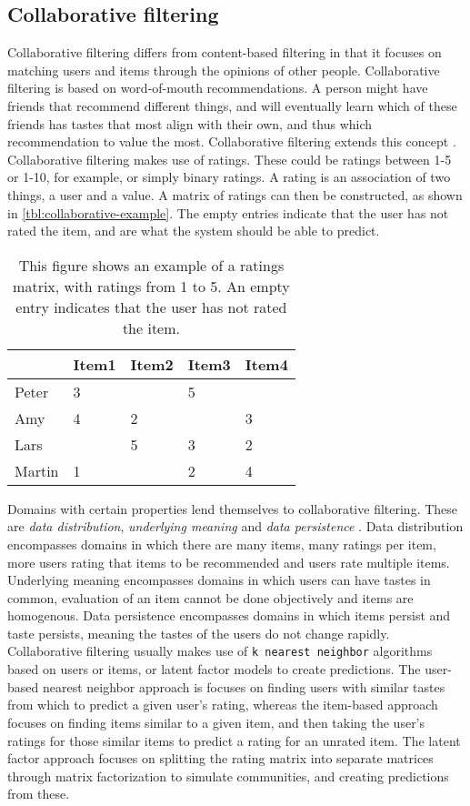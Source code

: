 \subsection{Collaborative filtering}
Collaborative filtering differs from content-based filtering in that it focuses on matching users and items through the opinions of other people.
Collaborative filtering is based on word-of-mouth recommendations.
A person might have friends that recommend different things, and will eventually learn which of these friends has tastes that most align with their own, and thus which recommendation to value the most.
Collaborative filtering extends this concept \cite{CollaborativeFiltering}.
Collaborative filtering makes use of ratings.
These could be ratings between 1-5 or 1-10, for example, or simply binary ratings.
A rating is an association of two things, a user and a value.
A matrix of ratings can then be constructed, as shown in \autoref{tbl:collaborative-example}.
The empty entries indicate that the user has not rated the item, and are what the system should be able to predict.
\begin{table}[H]
    \centering
    \begin{tabular}{|l|l|l|l|l|}
    \hline
           & Item1 & Item2 & Item3 & Item4 \\ \hline
    Peter  & 3     &       & 5     &       \\ \hline
    Amy    & 4     & 2     &       & 3     \\ \hline
    Lars   &       & 5     & 3     & 2     \\ \hline
    Martin & 1     &       & 2     & 4     \\ \hline
    \end{tabular}
    \caption{This figure shows an example of a ratings matrix, with ratings from 1 to 5. An empty entry indicates that the user has not rated the item.}
    \label{tbl:collaborative-example}
\end{table}
\noindent
Domains with certain properties lend themselves to collaborative filtering. 
These are \textit{data distribution}, \textit{underlying meaning} and \textit{data persistence} \cite{CollaborativeFiltering}.
Data distribution encompasses domains in which there are many items, many ratings per item, more users rating that items to be recommended and users rate multiple items.
Underlying meaning encompasses domains in which users can have tastes in common, evaluation of an item cannot be done objectively and items are homogenous.
Data persistence encompasses domains in which items persist and taste persists, meaning the tastes of the users do not change rapidly.
Collaborative filtering usually makes use of \texttt{k nearest neighbor} algorithms based on users or items, or latent factor models to create predictions.
The user-based nearest neighbor approach is focuses on finding users with similar tastes from which to predict a given user's rating, whereas the item-based approach focuses on finding items similar to a given item, and then taking the user's ratings for those similar items to predict a rating for an unrated item.
The latent factor approach focuses on splitting the rating matrix into separate matrices through matrix factorization to simulate communities, and creating predictions from these.


